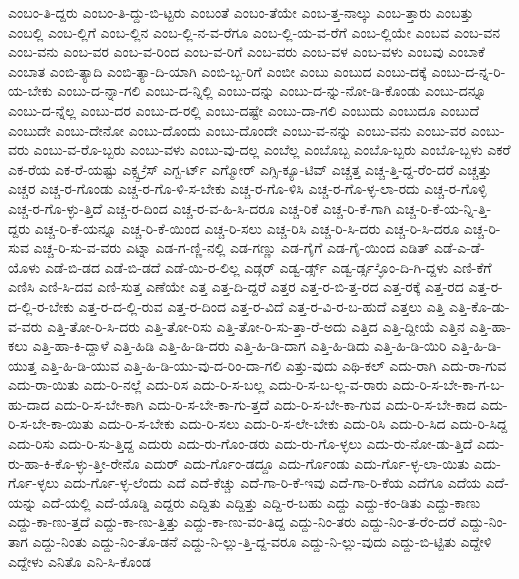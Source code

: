 {ಎಂಬಂ-ತಿ-ದ್ದರು
ಎಂಬಂ-ತಿ-ದ್ದು-ಬಿ-ಟ್ಟರು
ಎಂಬಂತೆ
ಎಂಬಂ-ತೆಯೇ
ಎಂಬ-ತ್ತ-ನಾಲ್ಕು
ಎಂಬ-ತ್ತಾರು
ಎಂಬತ್ತು
ಎಂಬಲ್ಲಿ
ಎಂಬ-ಲ್ಲಿಗೆ
ಎಂಬ-ಲ್ಲಿನ
ಎಂಬ-ಲ್ಲಿ-ನ-ವ-ರೆಗೂ
ಎಂಬ-ಲ್ಲಿ-ಯ-ವ-ರೆಗೆ
ಎಂಬ-ಲ್ಲಿಯೇ
ಎಂಬವ
ಎಂಬ-ವನ
ಎಂಬ-ವನು
ಎಂಬ-ವರ
ಎಂಬ-ವ-ರಿಂದ
ಎಂಬ-ವ-ರಿಗೆ
ಎಂಬ-ವರು
ಎಂಬ-ವಳ
ಎಂಬ-ವಳು
ಎಂಬವು
ಎಂಬಾಕೆ
ಎಂಬಾತ
ಎಂಬಿ-ತ್ಯಾದಿ
ಎಂಬಿ-ತ್ಯಾ-ದಿ-ಯಾಗಿ
ಎಂಬಿ-ಬ್ಬ-ರಿಗೆ
ಎಂಬೀ
ಎಂಬು
ಎಂಬುದ
ಎಂಬು-ದಕ್ಕೆ
ಎಂಬು-ದ-ನ್ನ-ರಿ-ಯ-ಬೇಕು
ಎಂಬು-ದ-ನ್ನಾ-ಗಲಿ
ಎಂಬು-ದ-ನ್ನಿಲ್ಲಿ
ಎಂಬು-ದನ್ನು
ಎಂಬು-ದ-ನ್ನು-ನೋ-ಡಿ-ಕೊಂಡು
ಎಂಬು-ದನ್ನೂ
ಎಂಬು-ದ-ನ್ನೆಲ್ಲ
ಎಂಬು-ದರ
ಎಂಬು-ದ-ರಲ್ಲಿ
ಎಂಬು-ದಷ್ಟೇ
ಎಂಬು-ದಾ-ಗಲಿ
ಎಂಬುದು
ಎಂಬುದೂ
ಎಂಬುದೆ
ಎಂಬುದೇ
ಎಂಬು-ದೇನೋ
ಎಂಬು-ದೊಂದು
ಎಂಬು-ದೊಂದೇ
ಎಂಬು-ವ-ನನ್ನು
ಎಂಬು-ವನು
ಎಂಬು-ವರ
ಎಂಬು-ವರು
ಎಂಬು-ವ-ರೊ-ಬ್ಬರು
ಎಂಬು-ವಳು
ಎಂಬು-ವು-ದಲ್ಲ
ಎಂಬೆಲ್ಲ
ಎಂಬೊಬ್ಬ
ಎಂಬೊ-ಬ್ಬರು
ಎಂಬೊ-ಬ್ಬಳು
ಎಕರೆ
ಎಕ-ರೆಯ
ಎಕ-ರೆ-ಯಷ್ಟು
ಎಕ್ಸ್ಪ-್ರೆಸ್
ಎಗ್ಬ-ರ್ಟ್
ಎಗ್ಮೋರ್
ಎಗ್ಸಿ-ಕ್ಯೂ-ಟಿವ್
ಎಚ್ಚತ್ತ
ಎಚ್ಚ-ತ್ತಿ-ದ್ದ-ರೆಂ-ದರೆ
ಎಚ್ಚತ್ತು
ಎಚ್ಚರ
ಎಚ್ಚ-ರ-ಗೊಂಡು
ಎಚ್ಚ-ರ-ಗೊ-ಳಿ-ಸ-ಬೇಕು
ಎಚ್ಚ-ರ-ಗೊ-ಳಿಸಿ
ಎಚ್ಚ-ರ-ಗೊ-ಳ್ಳ-ಲಾ-ರದು
ಎಚ್ಚ-ರ-ಗೊಳ್ಳಿ
ಎಚ್ಚ-ರ-ಗೊ-ಳ್ಳು-ತ್ತಿದೆ
ಎಚ್ಚ-ರ-ದಿಂದ
ಎಚ್ಚ-ರ-ವ-ಹಿ-ಸಿ-ದರೂ
ಎಚ್ಚ-ರಿಕೆ
ಎಚ್ಚ-ರಿ-ಕೆ-ಗಾಗಿ
ಎಚ್ಚ-ರಿ-ಕೆ-ಯ-ನ್ನಿ-ತ್ತಿ-ದ್ದರು
ಎಚ್ಚ-ರಿ-ಕೆ-ಯನ್ನೂ
ಎಚ್ಚ-ರಿ-ಕೆ-ಯಿಂದ
ಎಚ್ಚ-ರಿ-ಸಲು
ಎಚ್ಚ-ರಿಸಿ
ಎಚ್ಚ-ರಿ-ಸಿ-ದರು
ಎಚ್ಚ-ರಿ-ಸಿ-ದರೂ
ಎಚ್ಚ-ರಿ-ಸುವ
ಎಚ್ಚ-ರಿ-ಸು-ವ-ವರು
ಎಟ್ನಾ
ಎಡ-ಗ-ಣ್ಣಿ-ನಲ್ಲಿ
ಎಡ-ಗಣ್ಣು
ಎಡ-ಗೈಗೆ
ಎಡ-ಗೈ-ಯಿಂದ
ಎಡಿತ್
ಎಡೆ-ಎ-ಡೆ-ಯೊಳು
ಎಡೆ-ಬಿ-ಡದ
ಎಡೆ-ಬಿ-ಡದೆ
ಎಡೆ-ಯಿ-ರ-ಲಿಲ್ಲ
ಎಡ್ಗರ್
ಎಡ್ವ-ರ್ಡ್ಸ್
ಎಡ್ವ-ರ್ಡ್ಸ-್ಳೊಂ-ದಿ-ಗಿ-ದ್ದಳು
ಎಣಿ-ಕೆಗೆ
ಎಣಿಸಿ
ಎಣಿ-ಸಿ-ದವ
ಎಣಿ-ಸುತ್ತ
ಎಣೆಯೇ
ಎತ್ತ
ಎತ್ತ-ದಿ-ದ್ದರೆ
ಎತ್ತರ
ಎತ್ತ-ರ-ಬಿ-ತ್ತ-ರದ
ಎತ್ತ-ರಕ್ಕೆ
ಎತ್ತ-ರದ
ಎತ್ತ-ರ-ದ-ಲ್ಲಿ-ರ-ಬೇಕು
ಎತ್ತ-ರ-ದ-ಲ್ಲಿ-ರುವ
ಎತ್ತ-ರ-ದಿಂದ
ಎತ್ತ-ರ-ವಿದೆ
ಎತ್ತ-ರ-ವಿ-ರ-ಬ-ಹುದೆ
ಎತ್ತಲು
ಎತ್ತಿ
ಎತ್ತಿ-ಕೊ-ಡು-ವ-ವರು
ಎತ್ತಿ-ತೋ-ರಿ-ಸಿ-ದರು
ಎತ್ತಿ-ತೋ-ರಿಸು
ಎತ್ತಿ-ತೋ-ರಿ-ಸು-ತ್ತಾ-ರೆ-ಅದು
ಎತ್ತಿದ
ಎತ್ತಿ-ದ್ದೀಯೆ
ಎತ್ತಿನ
ಎತ್ತಿ-ಹಾ-ಕಲು
ಎತ್ತಿ-ಹಾ-ಕಿ-ದ್ದಾಳೆ
ಎತ್ತಿ-ಹಿಡಿ
ಎತ್ತಿ-ಹಿ-ಡಿ-ದರು
ಎತ್ತಿ-ಹಿ-ಡಿ-ದಾಗ
ಎತ್ತಿ-ಹಿ-ಡಿದು
ಎತ್ತಿ-ಹಿ-ಡಿ-ಯಿರಿ
ಎತ್ತಿ-ಹಿ-ಡಿ-ಯುತ್ತ
ಎತ್ತಿ-ಹಿ-ಡಿ-ಯುವ
ಎತ್ತಿ-ಹಿ-ಡಿ-ಯು-ವು-ದ-ರಿಂ-ದಾ-ಗಲಿ
ಎತ್ತು-ವುದು
ಎಥಿ-ಕಲ್
ಎದು-ರಾಗಿ
ಎದು-ರಾ-ಗುವ
ಎದು-ರಾ-ಯಿತು
ಎದು-ರಿ-ನಲ್ಲೆ
ಎದು-ರಿಸ
ಎದು-ರಿ-ಸ-ಬಲ್ಲ
ಎದು-ರಿ-ಸ-ಬ-ಲ್ಲ-ವ-ರಾರು
ಎದು-ರಿ-ಸ-ಬೇ-ಕಾ-ಗ-ಬ-ಹು-ದಾದ
ಎದು-ರಿ-ಸ-ಬೇ-ಕಾಗಿ
ಎದು-ರಿ-ಸ-ಬೇ-ಕಾ-ಗು-ತ್ತದೆ
ಎದು-ರಿ-ಸ-ಬೇ-ಕಾ-ಗುವ
ಎದು-ರಿ-ಸ-ಬೇ-ಕಾದ
ಎದು-ರಿ-ಸ-ಬೇ-ಕಾ-ಯಿತು
ಎದು-ರಿ-ಸ-ಬೇಕು
ಎದು-ರಿ-ಸಲು
ಎದು-ರಿ-ಸ-ಲೇ-ಬೇಕು
ಎದು-ರಿಸಿ
ಎದು-ರಿ-ಸಿದ
ಎದು-ರಿ-ಸಿದ್ದ
ಎದು-ರಿಸು
ಎದು-ರಿ-ಸು-ತ್ತಿದ್ದ
ಎದುರು
ಎದು-ರು-ಗೊಂ-ಡರು
ಎದು-ರು-ಗೊ-ಳ್ಳಲು
ಎದು-ರು-ನೋ-ಡು-ತ್ತಿದೆ
ಎದು-ರು-ಹಾ-ಕಿ-ಕೊ-ಳ್ಳು-ತ್ತೀ-ರೇನೊ
ಎದುರ್
ಎದು-ರ್ಗೊಂ-ಡದ್ದೂ
ಎದು-ರ್ಗೊಂಡು
ಎದು-ರ್ಗೊ-ಳ್ಳ-ಲಾ-ಯಿತು
ಎದು-ರ್ಗೊ-ಳ್ಳಲು
ಎದು-ರ್ಗೊ-ಳ್ಳ-ಲೆಂದು
ಎದೆ
ಎದೆ-ಕೆಚ್ಚು
ಎದೆ-ಗಾ-ರಿ-ಕೆ-ಇವು
ಎದೆ-ಗಾ-ರಿ-ಕೆಯ
ಎದೆಗೂ
ಎದೆಯ
ಎದೆ-ಯನ್ನು
ಎದೆ-ಯಲ್ಲಿ
ಎದೆ-ಯೊಡ್ಡಿ
ಎದ್ದರು
ಎದ್ದಿತು
ಎದ್ದಿತ್ತು
ಎದ್ದಿ-ರ-ಬಹು
ಎದ್ದು
ಎದ್ದು-ಕಂ-ಡಿತು
ಎದ್ದು-ಕಾಣು
ಎದ್ದು-ಕಾ-ಣು-ತ್ತದೆ
ಎದ್ದು-ಕಾ-ಣು-ತ್ತಿತ್ತು
ಎದ್ದು-ಕಾ-ಣು-ವಂ-ತಿದ್ದ
ಎದ್ದು-ನಿಂ-ತರು
ಎದ್ದು-ನಿಂ-ತ-ರೆಂ-ದರೆ
ಎದ್ದು-ನಿಂ-ತಾಗ
ಎದ್ದು-ನಿಂತು
ಎದ್ದು-ನಿಂ-ತೊ-ಡನೆ
ಎದ್ದು-ನಿ-ಲ್ಲು-ತ್ತಿ-ದ್ದ-ವರೂ
ಎದ್ದು-ನಿ-ಲ್ಲು-ವುದು
ಎದ್ದು-ಬಿ-ಟ್ಟಿತು
ಎದ್ದೇಳಿ
ಎದ್ದೇಳು
ಎನಿತೊ
ಎನಿ-ಸಿ-ಕೊಂಡ
}
